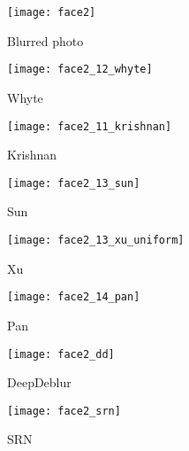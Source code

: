\documentclass[10pt,twocolumn,letterpaper]{article}
\begin{document}
\label{s:results}
\begin{figure*}[htb]
	\centering
\begin{subfigure}[t]{0.225\textwidth}
        \texttt{[image: face2]}
        \caption{Blurred photo}
        \label{fig:lai_in}
    \end{subfigure}
    \begin{subfigure}[t]{0.225\textwidth}
        \texttt{[image: face2\_12\_whyte]}
        \caption{Whyte~\etal~\cite{whyte}}
        \label{fig:lai_whyte}
    \end{subfigure}
    \begin{subfigure}[t]{0.225\textwidth}
        \texttt{[image: face2\_11\_krishnan]}
        \caption{Krishnan~\etal \cite{normalized_sparsity}}
        \label{fig:lai_k}
    \end{subfigure}
    \begin{subfigure}[t]{0.225\textwidth}
        \texttt{[image: face2\_13\_sun]}
        \caption{Sun~\etal~\cite{SunLearningRemoval}}
        \label{fig:lai_sun}
    \end{subfigure}


    \bigskip
	\centering
    \begin{subfigure}[t]{0.225\textwidth}
        \texttt{[image: face2\_13\_xu\_uniform]}
        \caption{Xu~\etal ~\cite{XuUnnaturalDeblurring}}
        \label{fig:lai_xu}
    \end{subfigure}
    \begin{subfigure}[t]{0.225\textwidth}
        \texttt{[image: face2\_14\_pan]}
        \caption{Pan~\etal~\cite{darkchannelprior}}
        \label{fig:lai_whyte}
    \end{subfigure}
        \begin{subfigure}[t]{0.225\textwidth}
        \texttt{[image: face2\_dd]}
        \caption{DeepDeblur \cite{Nah2016DeepDeblurring}}
        \label{fig:lai_dd}
    \end{subfigure}
    \begin{subfigure}[t]{0.225\textwidth}
        \texttt{[image: face2\_srn]}
        \caption{SRN \cite{tao2018scale}}
        \label{fig:lai_k}
    \end{subfigure}



\end{figure*}
\end{document}
